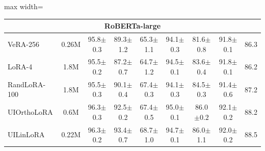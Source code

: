 \begin{table}[ht]
\begin{adjustbox}{max width=\linewidth}
\begin{tabular}{@{}lcccccccc@{}}
\midrule
\multicolumn{9}{c}{\textbf{RoBERTa-large}} \\
\midrule
VeRA-256     & 0.26M & 95.8{\scriptsize$\pm$0.3} & 89.3{\scriptsize$\pm$1.2} & 65.3{\scriptsize$\pm$1.1} & 94.1{\scriptsize$\pm$0.3} & 81.6{\scriptsize$\pm$0.8} & 91.8{\scriptsize$\pm$0.1} & 86.3 \\
LoRA-4       & 1.8M  & 95.5{\scriptsize$\pm$0.2} & 87.2{\scriptsize$\pm$0.7} & 64.7{\scriptsize$\pm$1.2} & 94.5{\scriptsize$\pm$0.1} & 83.6{\scriptsize$\pm$0.4} & 91.8{\scriptsize$\pm$0.1} & 86.2 \\
RandLoRA-100 & 1.8M  & 95.5{\scriptsize$\pm$0.3} & 90.1{\scriptsize$\pm$0.4} & 67.4{\scriptsize$\pm$0.3} & 94.1{\scriptsize$\pm$0.3} & 84.5{\scriptsize$\pm$0.3} & 91.4{\scriptsize$\pm$0.6} & 87.2 \\
\addlinespace
UIOrthoLoRA  & 0.6M    & 96.3{\scriptsize$\pm$0.3} & 92.5{\scriptsize$\pm$0.2} & 67.4{\scriptsize$\pm$0.5} & 95.0{\scriptsize$\pm$0.1} & 86.0{\scriptsize$\pm 0.2$} & 92.1{\scriptsize$\pm$0.2} & 88.2 \\
UILinLoRA    & 0.22M    & 96.3{\scriptsize$\pm$0.2} & 93.4{\scriptsize$\pm$0.7} & 68.7{\scriptsize$\pm$1.0} & 94.7{\scriptsize$\pm$0.1} & 86.0{\scriptsize$\pm$1.1} & 92.0{\scriptsize$\pm$0.2} & 88.5 \\

\bottomrule
\end{tabular}
\end{adjustbox}

\vspace{0.3em}
\end{table}
